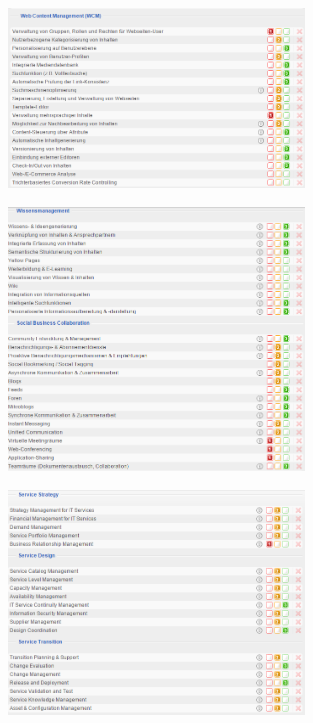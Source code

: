 \documentclass[12pt]{article}
\begin{document}
\noindent
\begin{figure}[here!]
\centering
\includegraphics[width=0.7\textwidth]{images/tr36}
\end{figure}\FloatBarrier
\noindent
\begin{figure}[here!]
\centering
\includegraphics[width=0.7\textwidth]{images/tr37}
\end{figure}\FloatBarrier
\noindent
\begin{figure}[here!]
\centering
\includegraphics[width=0.7\textwidth]{images/tr38}
\end{figure}\FloatBarrier
\end{document}
